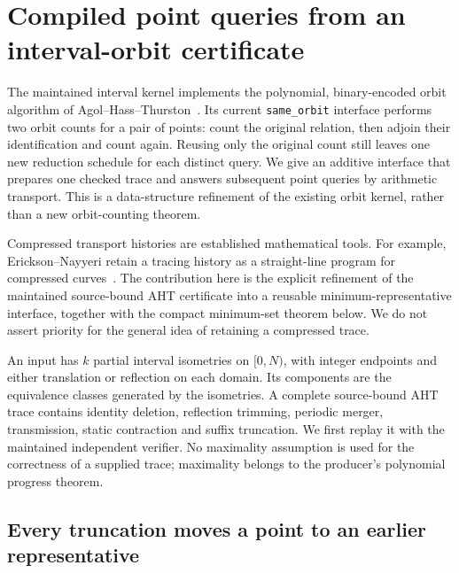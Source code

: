 \section{Compiled point queries from an interval-orbit certificate}
\label{sec:compiled-orbit-index}

The maintained interval kernel implements the polynomial, binary-encoded
orbit algorithm of Agol--Hass--Thurston~\cite{aht}. Its current \texttt{same\_orbit}
interface performs two orbit counts for a pair of points: count the original
relation, then adjoin their identification and count again.  Reusing only the
original count still leaves one new reduction schedule for each distinct
query.  We give an additive interface that prepares one checked trace and
answers subsequent point queries by arithmetic transport.  This is a
data-structure refinement of the existing orbit kernel, rather than a new
orbit-counting theorem.

Compressed transport histories are established mathematical tools.
For example, Erickson--Nayyeri retain a tracing history as a straight-line
program for compressed curves~\cite{erickson-nayyeri}. The contribution
here is the explicit refinement of the maintained source-bound AHT
certificate into a reusable minimum-representative interface, together
with the compact minimum-set theorem below. We do not assert priority
for the general idea of retaining a compressed trace.

An input has $k$ partial interval isometries on $[0,N)$, with integer endpoints
and either translation or reflection on each domain.  Its components are the
equivalence classes generated by the isometries.  A complete source-bound AHT
trace contains identity deletion, reflection trimming, periodic merger,
transmission, static contraction and suffix truncation.  We first replay it
with the maintained independent verifier.  No maximality assumption is used
for the correctness of a supplied trace; maximality belongs to the producer's
polynomial progress theorem.

\subsection{Every truncation moves a point to an earlier representative}

